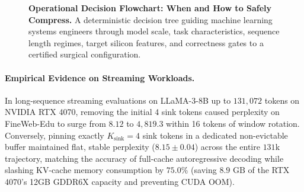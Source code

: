 \begin{figure}[t]
{%
}
\caption[Operational Decision Flowchart]{\textbf{Operational Decision Flowchart: When and How to Safely Compress.} A deterministic decision tree guiding machine learning systems engineers through model scale, task characteristics, sequence length regimes, target silicon features, and correctness gates to a certified surgical configuration.}
\label{fig:decision_flowchart}
\end{figure}

\paragraph{Empirical Evidence on Streaming Workloads.}
In long-sequence streaming evaluations on LLaMA-3-8B up to $131{,}072$ tokens on NVIDIA RTX 4070, removing the initial 4 sink tokens caused perplexity on FineWeb-Edu to surge from $8.12$ to $4{,}819.3$ within 16 tokens of window rotation. Conversely, pinning exactly $K_{\text{sink}} = 4$ sink tokens in a dedicated non-evictable buffer maintained flat, stable perplexity ($8.15 \pm 0.04$) across the entire $131\text{k}$ trajectory, matching the accuracy of full-cache autoregressive decoding while slashing KV-cache memory consumption by $75.0\%$ (saving $8.9\text{ GB}$ of the RTX 4070's 12GB GDDR6X capacity and preventing CUDA OOM).

